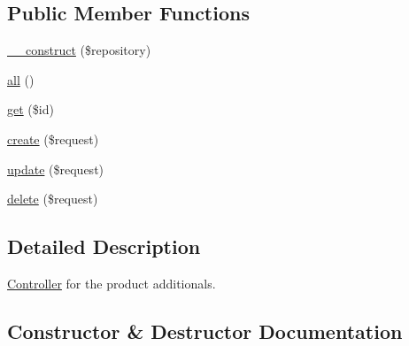 \subsection*{Public Member Functions}
\begin{DoxyCompactItemize}
\item 
\mbox{\hyperlink{class_app_1_1_http_1_1_controllers_1_1_product_1_1_additional_controller_a5b75ba6bc9debb999c0186a31978ec03}{\+\_\+\+\_\+construct}} (\$repository)
\item 
\mbox{\hyperlink{class_app_1_1_http_1_1_controllers_1_1_product_1_1_additional_controller_af9d14e4ae6227970ad603987781573ca}{all}} ()
\item 
\mbox{\hyperlink{class_app_1_1_http_1_1_controllers_1_1_product_1_1_additional_controller_a50e3bfb586b2f42932a6a93f3fbb0828}{get}} (\$id)
\item 
\mbox{\hyperlink{class_app_1_1_http_1_1_controllers_1_1_product_1_1_additional_controller_a4fa811c83f27da01b0d92bdb2a711a13}{create}} (\$request)
\item 
\mbox{\hyperlink{class_app_1_1_http_1_1_controllers_1_1_product_1_1_additional_controller_ab7b27a90191560dcef32126b0945db0d}{update}} (\$request)
\item 
\mbox{\hyperlink{class_app_1_1_http_1_1_controllers_1_1_product_1_1_additional_controller_a126a3799c44d72393ca4732081306dfd}{delete}} (\$request)
\end{DoxyCompactItemize}


\subsection{Detailed Description}
\mbox{\hyperlink{class_app_1_1_http_1_1_controllers_1_1_controller}{Controller}} for the product additionals. 

\subsection{Constructor \& Destructor Documentation}
\mbox{\label{class_app_1_1_http_1_1_controllers_1_1_product_1_1_additional_controller_a5b75ba6bc9debb999c0186a31978ec03}} 
